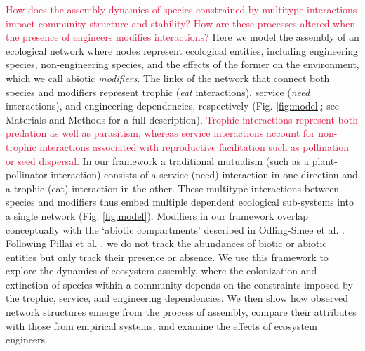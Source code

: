 \documentclass[twocolumn,preprintnumbers,amsmath,amssymb,superscriptaddress,linenumbers]{revtex4-1}
\newcommand{\rev}[1]{\textcolor{crimson}{#1}}
\begin{document}
\rev{How does the assembly dynamics of species constrained by multitype interactions impact community structure and stability?
How are these processes altered when the presence of engineers modifies interactions?}
Here we model the assembly of an ecological network where nodes represent ecological entities, including engineering species, non-engineering species, and the effects of the former on the environment, which we call abiotic \emph{modifiers}.
The links of the network that connect both species and modifiers represent trophic (\emph{eat} interactions), service (\emph{need} interactions), and engineering dependencies, respectively (Fig. \ref{fig:model}; see Materials and Methods for a full description).
\rev{Trophic interactions represent both predation as well as parasitism, whereas service interactions account for non-trophic interactions associated with reproductive facilitation such as pollination or seed dispersal.}
In our framework a traditional mutualism (such as a plant-pollinator interaction) consists of a service (need) interaction in one direction and a trophic (eat) interaction in the other.
These multitype interactions between species and modifiers thus embed multiple dependent ecological sub-systems into a single network (Fig. \ref{fig:model}). %
Modifiers in our framework overlap conceptually with the `abiotic compartments' described in Odling-Smee et al. \cite{OdlingSmee2013}.
Following Pillai et al. \cite{Pillai2011}, we do not track the abundances of biotic or abiotic entities but only track their presence or absence.
We use this framework to explore the dynamics of ecosystem assembly, where the colonization and extinction of species within a community depends on the constraints imposed by the trophic, service, and engineering dependencies.
We then show how observed network structures emerge from the process of assembly, compare their attributes with those from empirical systems, and examine the effects of ecosystem engineers.
\end{document}
